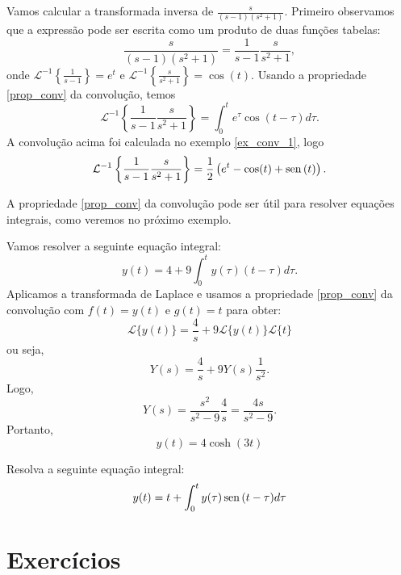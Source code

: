 \begin{ex}Vamos calcular a transformada inversa de $\frac{s}{(s-1)(s^2+1)}$. Primeiro observamos que a expressão pode ser escrita como um produto de duas funções tabelas:
$$
\frac{s}{(s-1)(s^2+1)}=\frac{1}{s-1}\frac{s}{s^2+1},
$$
 onde $\mathcal{L}^{-1}\left\{\frac{1}{s-1}\right\}=e^t$ e $\mathcal{L}^{-1}\left\{\frac{s}{s^2+1}\right\}=\cos(t)$. Usando a propriedade \ref{prop_conv} da convolução, temos
 $$
 \mathcal{L}^{-1}\left\{\frac{1}{s-1}\frac{s}{s^2+1}\right\}=\int_0^t e^\tau \cos(t-\tau)d\tau.
 $$
 A convolução acima foi calculada no exemplo \ref{ex_conv_1}, logo
$$
 \mathcal{L}^{-1}\left\{\frac{1}{s-1}\frac{s}{s^2+1}\right\}= \frac{1}{2}\left(e^t-\cos(t)+\operatorname{sen}\,(t)  \right).
 $$
 \end{ex}
 A propriedade \ref{prop_conv} da convolução pode ser útil para resolver equações integrais, como veremos no próximo exemplo.
 \begin{ex} Vamos resolver a seguinte equação integral:
 $$
 y(t)=4+9\int_0^t y(\tau)(t-\tau)d\tau.
 $$
 Aplicamos a transformada de Laplace e usamos a propriedade \ref{prop_conv} da convolução com $f(t)=y(t)$ e $g(t)=t$ para obter:
 $$
 \mathcal{L}\{y(t)\}=\frac{4}{s}+9\mathcal{L}\{y(t)\}\mathcal{L}\{t\}
 $$
 ou seja,
 $$
 Y(s)=\frac{4}{s}+9Y(s)\frac{1}{s^2}.
 $$
 Logo,
 $$
 Y(s)=\frac{s^2}{s^2-9}\frac{4}{s}=\frac{4s}{s^2-9}.
 $$
 Portanto,
 $$
 y(t)=4\cosh(3t)
 $$
 
\end{ex}
\begin{exer}Resolva a seguinte equação integral:
$$
y(t)=t+\int_0^t y(\tau)\operatorname{sen}\,(t-\tau)d\tau
$$
 
\end{exer}

\section{Exercícios}



